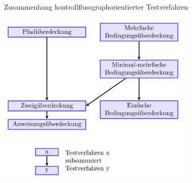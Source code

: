\begin{bonus}{Zusammenhang kontrollflussgraphorientierter Testverfahren}
    \begin{center}
        \includegraphics[width=0.7\textwidth]{includes/figures/bonus_kontrollfluss_test.png}
    \end{center}
\end{bonus}


